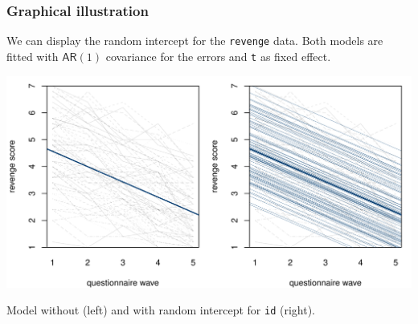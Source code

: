 \documentclass{beamer}
\begin{document}
\begin{frame}[fragile]
\frametitle{Graphical illustration}
We can display the random intercept for the \texttt{revenge} data. Both models are fitted with $\mathsf{AR}(1)$ covariance for the errors and \texttt{t} as fixed effect.

\begin{center}
\includegraphics[width = 0.8\linewidth]{img/c6/07-mixed-randomintercept}
\end{center}
{\footnotesize 
Model without (left) and with random intercept for \texttt{id} (right).

}
\end{frame}
% 
% 
% 
\end{document}
